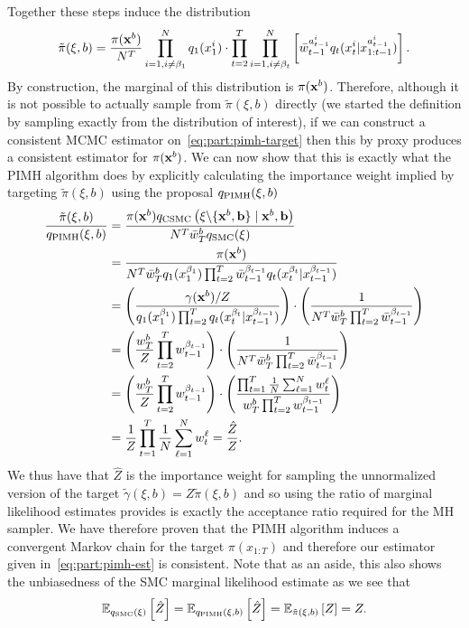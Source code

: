 Together these steps induce the distribution
\begin{align}
\label{eq:part:pimh-target}
\tilde{\pi}(\xi,b) = \frac{\pi(\mathbf{x}^{b})}{N^T} \prod_{i=1, i\neq\beta_1}^N q_1(x_{1}^i) \cdot \prod_{t=2}^T \prod_{i=1, i\neq\beta_t}^N \left[ 
\bar w_{t-1}^{a_{t-1}^i}
q_t(x_{t}^i|x_{1:t-1}^{a_{t-1}^i}) \right].
\end{align}
By construction, the marginal of this distribution is $\pi(\mathbf{x}^{b})$.
Therefore, although it is not possible to actually
sample from $\tilde{\pi}(\xi,b)$ directly (we started the definition by sampling exactly
from the distribution of interest), if we can
construct a consistent MCMC estimator on~\eqref{eq:part:pimh-target} then this by proxy
produces a consistent estimator for $\pi(\mathbf{x}^{b})$.
We can now show that this is exactly what the
PIMH algorithm does by explicitly calculating the importance weight implied by
targeting $\tilde{\pi}(\xi,b)$ using the proposal $q_{\text{PIMH}}(\mathbf{\xi},b)$
\begin{align}
\frac{\tilde{\pi}(\xi,b)}{q_{\text{PIMH}}(\mathbf{\xi},b)} &= \frac{\pi(\mathbf{x}^{b}) q_{\text{CSMC}}\left(\mathbf{\xi} \backslash \{\mathbf{x}^b, \mathbf{b}\} \mid \mathbf{x}^b, \mathbf{b} \right)}
{N^T \bar{w}_T^b q_{\text{SMC}}(\mathbf{\xi})} \\
&= \frac{\pi(\mathbf{x}^{b})}{N^T \bar{w}_T^b q_1(x_1^{\beta_1}) \prod_{t=2}^{T} \bar{w}_{t-1}^{\beta_{t-1}} q_t(x_t^{\beta_t} | x_{t-1}^{\beta_{t-1}})} \nonumber \\
&= \left(\frac{\gamma(\mathbf{x}^{b})/Z}{
	q_1(x_1^{\beta_1}) \prod_{t=2}^{T} q_t(x_t^{\beta_t} | x_{t-1}^{\beta_{t-1}})}\right) \cdot
	\left( \frac{1}{N^T \bar{w}_T^b\prod_{t=2}^{T} \bar{w}_{t-1}^{\beta_{t-1}}} \right) \nonumber \\
&= \left(\frac{w_T^b}{Z}
	 \prod_{t=2}^{T} w_{t-1}^{\beta_{t-1}}\right)\cdot\left(
	\frac{1}{N^T \bar{w}_T^b \prod_{t=2}^{T} \bar{w}_{t-1}^{\beta_{t-1}}}\right) \nonumber \\
&= \left(\frac{w_T^b}{Z}
	\prod_{t=2}^{T} w_{t-1}^{\beta_{t-1}}\right)\cdot\left(
	\frac{\prod_{t=1}^T \frac{1}{N} \sum_{\ell=1}^N w_{t}^{\ell}}{w_T^b \prod_{t=2}^{T} w_{t-1}^{\beta_{t-1}}}\right) \nonumber \\
&= \frac{1}{Z} \prod_{t=1}^T \frac{1}{N} \sum_{\ell=1}^N w_{t}^{\ell}
= \frac{\hat{Z}}{Z}.
\end{align}
We thus have that $\hat{Z}$ is the importance weight for sampling the unnormalized
version of the target $\tilde{\gamma}(\xi,b) = Z \tilde{\pi}(\xi,b)$ and so using the
ratio of marginal likelihood estimates provides is exactly the acceptance ratio required for
the MH sampler.  We
have therefore proven that the PIMH algorithm induces a convergent Markov chain for
the target $\pi(x_{1:T})$ and therefore our estimator given in~\eqref{eq:part:pimh-est} is
consistent.
Note that as an aside, this also shows the unbiasedness of the SMC marginal likelihood estimate
as we see that
\begin{align}
\mathbb{E}_{q_{\text{SMC}}(\mathbf{\xi})} \left[\hat{Z}\right] = \mathbb{E}_{q_{\text{PIMH}}(\mathbf{\xi},b)} 
\left[\hat{Z}\right]=\mathbb{E}_{\tilde{\pi}(\xi,b)} \left[Z\right]=Z.
\end{align}

